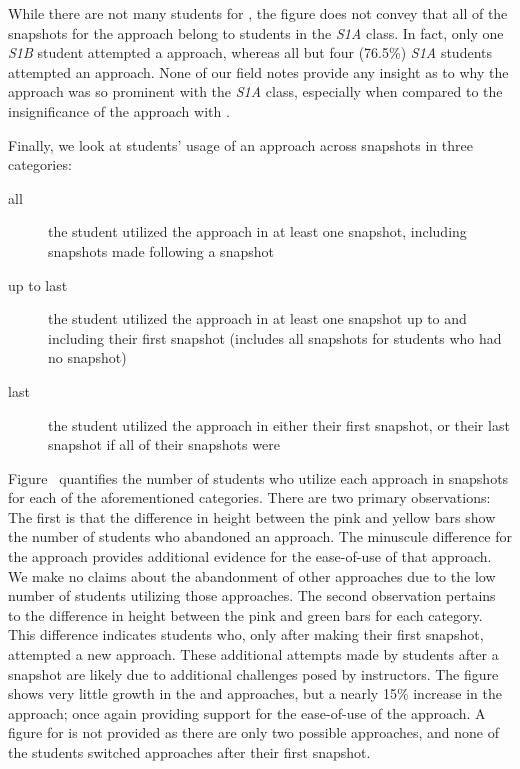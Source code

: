 While there are not many students for \sone{}, the figure does not convey that
all of the \com{} snapshots for the \rel{} approach belong to students in the
\emph{S1A} class. In fact, only one \emph{S1B} student attempted a \rel{}
approach, whereas all but four (76.5\%) \emph{S1A} students attempted an \abs{}
approach. None of our field notes provide any insight as to why the \rel{}
approach was so prominent with the \emph{S1A} class, especially when compared
to the insignificance of the \rel{} approach with \stwo{}.

Finally, we look at students' usage of an approach across snapshots in three
categories:

\begin{description}
\item[all] the student utilized the approach in at least one snapshot,
  including snapshots made following a \com{} snapshot
\item[up to last] the student utilized the approach in at least one snapshot up
  to and including their first \com{} snapshot (includes all snapshots for
  students who had no \com{} snapshot)
\item[last] the student utilized the approach in either their first \com{}
  snapshot, or their last snapshot if all of their snapshots were \incom{}
\end{description}

Figure~ quantifies the number of students who
utilize each approach in \stwo{} snapshots for each of the aforementioned
categories. There are two primary observations: The first is that the
difference in height between the pink and yellow bars show the number of
students who abandoned an approach. The minuscule difference for the \glideto{}
approach provides additional evidence for the ease-of-use of that approach. We
make no claims about the abandonment of other approaches due to the low number
of students utilizing those approaches. The second observation pertains to the
difference in height between the pink and green bars for each category. This
difference indicates students who, only after making their first \com{}
snapshot, attempted a new approach. These additional attempts made by students
after a \com{} snapshot are likely due to additional challenges posed by
instructors. The figure shows very little growth in the \abs{} and \rel{}
approaches, but a nearly 15\% increase in the \glideto{} approach; once again
providing support for the ease-of-use of the \glideto{} approach. A figure for
\sone{} is not provided as there are only two possible approaches, and none of
the students switched approaches after their first \com{} snapshot.

